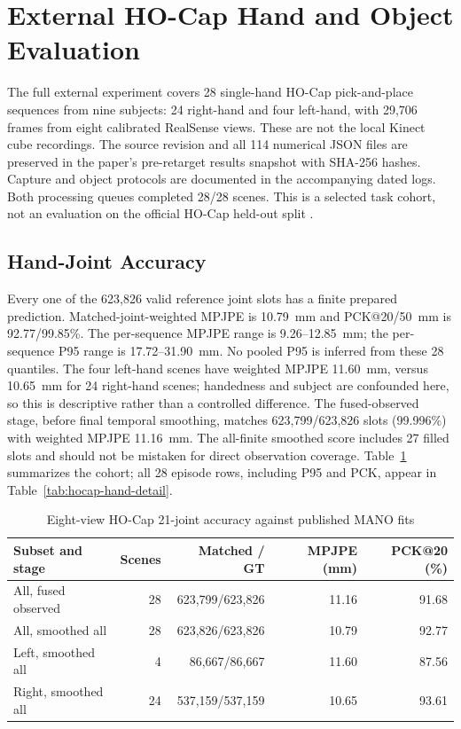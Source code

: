 \section{External HO-Cap Hand and Object Evaluation}
\label{sec:hocap-results}

The full external experiment covers 28 single-hand HO-Cap pick-and-place
sequences from nine subjects: 24 right-hand and four left-hand, with 29,706
frames from eight calibrated RealSense views. These are not the local Kinect
cube recordings. The source revision and all 114 numerical JSON files are preserved in
the paper's pre-retarget results snapshot with SHA-256 hashes. Capture
and object protocols are documented in the accompanying dated logs.
Both processing queues completed 28/28 scenes. This is a selected task cohort, not an evaluation
on the official HO-Cap held-out split \cite{hocap}.

\subsection{Hand-Joint Accuracy}

Every one of the 623,826 valid reference joint slots has a finite prepared
prediction. Matched-joint-weighted MPJPE is 10.79~mm and PCK@20/50~mm is
92.77/99.85\%. The per-sequence MPJPE range is 9.26--12.85~mm; the
per-sequence P95 range is 17.72--31.90~mm. No pooled P95 is inferred from
these 28 quantiles. The four left-hand scenes have weighted MPJPE
11.60~mm, versus 10.65~mm for 24 right-hand scenes; handedness and subject
are confounded here, so this is descriptive rather than a controlled
difference. The fused-observed stage, before final temporal smoothing,
matches 623,799/623,826 slots (99.996\%) with weighted MPJPE 11.16~mm.
The all-finite smoothed score includes 27 filled slots and should not be
mistaken for direct observation coverage. Table~\ref{tab:hocap-hand-summary}
summarizes the cohort; all 28 episode rows, including P95 and PCK, appear
in Table~\ref{tab:hocap-hand-detail}.

\begin{table}[htbp]
\caption{Eight-view HO-Cap 21-joint accuracy against published MANO fits}
\label{tab:hocap-hand-summary}
\centering\small
\begin{tabular}{lrrrr}
\toprule
Subset and stage & Scenes & Matched / GT & MPJPE (mm) & PCK@20 (\%) \\
\midrule
All, fused observed & 28 & 623,799/623,826 & 11.16 & 91.68 \\
All, smoothed all & 28 & 623,826/623,826 & 10.79 & 92.77 \\
Left, smoothed all & 4 & 86,667/86,667 & 11.60 & 87.56 \\
Right, smoothed all & 24 & 537,159/537,159 & 10.65 & 93.61 \\
\bottomrule
\end{tabular}
\end{table}


